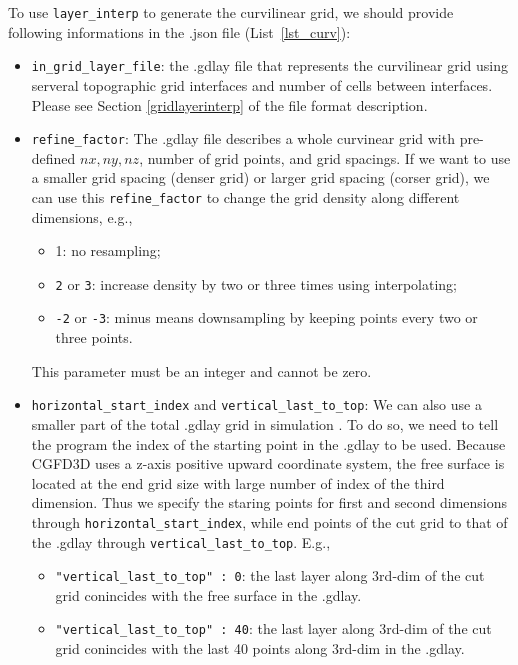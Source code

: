 To use \verb|layer_interp| to generate the curvilinear grid,
we should provide following informations in the .json file (List~\ref{lst_curv}):
\begin{itemize}
  \item \verb|in_grid_layer_file|: the .gdlay file that represents the curvilinear grid using
      serveral topographic grid interfaces and number of cells between interfaces.
      Please see Section \ref{gridlayerinterp} of the file format description. 
  \item \verb|refine_factor|: 
      The .gdlay file describes a whole curvinear grid with 
      pre-defined $nx,ny,nz$, number of grid points, and grid spacings.
      If we want to use a smaller grid spacing (denser grid) or larger grid spacing (corser grid),
      we can use this \verb|refine_factor| to change the grid density along different dimensions, e.g.,
      \begin{itemize}
        \item 1: no resampling;
        \item \texttt{2} or \texttt{3}: increase density by two or three times using interpolating;
        \item \texttt{-2} or \texttt{-3}: minus means downsampling by keeping points 
              every two or three points.
      \end{itemize}
      This parameter must be an integer and cannot be zero.
  \item \verb|horizontal_start_index| and \verb|vertical_last_to_top|: 
    We can also use a smaller part of the total .gdlay grid in simulation .
    To do so, we need to tell the program the index of the starting point in the .gdlay to be used.
    Because CGFD3D uses a z-axis positive upward coordinate system, 
    the free surface is located at the end grid size with large number of index of the third dimension.
    Thus we specify the staring points for first and second dimensions through \verb|horizontal_start_index|, 
    while end points of the cut grid to that of the .gdlay through \verb|vertical_last_to_top|.
    E.g.,
    \begin{itemize}
      \item \verb|"vertical_last_to_top" : 0|:
          the last layer along 3rd-dim of the cut grid conincides with the free surface in the .gdlay.
      \item \verb|"vertical_last_to_top" : 40|:
          the last layer along 3rd-dim of the cut grid conincides with 
            the last 40 points along 3rd-dim in the .gdlay.

\end{itemize}
\end{itemize}
